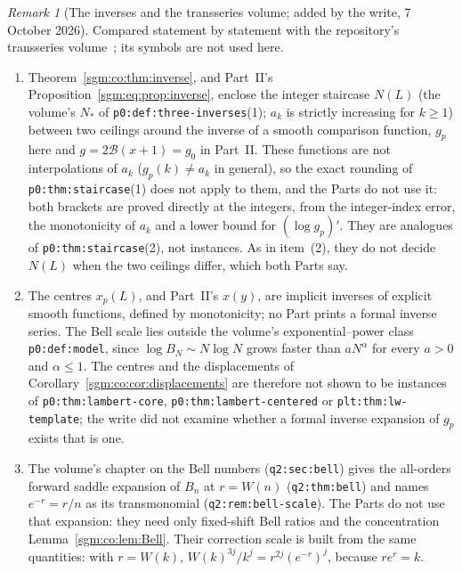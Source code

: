 \documentclass[11pt,letterpaper]{article}
\theoremstyle{remark}\newtheorem{remark}[theorem]{Remark}
\newcommand{\file}[1]{\nolinkurl{#1}}
\theoremstyle{definition}\newtheorem{definition}[theorem]{Definition}
\begin{document}
\begin{remark}[The inverses and the transseries volume; added by the write, 7 October 2026]\label{sgm:co:rem:transseries}
Compared statement by statement with the repository's transseries volume~\cite{TSvol}; its symbols are not used here.
\begin{enumerate}
\item Theorem~\ref{sgm:co:thm:inverse}, and Part~II's Proposition~\ref{sgm:eq:prop:inverse}, enclose the integer staircase $N(L)$ (the volume's $N_\ast$ of \file{p0:def:three-inverses}(1); $a_k$ is strictly increasing for $k\ge1$) between two ceilings around the inverse of a smooth comparison function, $g_p$ here and $g=2\mathcal B(x+1)=g_0$ in Part~II. These functions are not interpolations of $a_k$ ($g_p(k)\ne a_k$ in general), so the exact rounding of \file{p0:thm:staircase}(1) does not apply to them, and the Parts do not use it: both brackets are proved directly at the integers, from the integer-index error, the monotonicity of $a_k$ and a lower bound for $(\log g_p)'$. They are analogues of \file{p0:thm:staircase}(2), not instances. As in item~(2), they do not decide $N(L)$ when the two ceilings differ, which both Parts say.
\item The centres $x_p(L)$, and Part~II's $x(y)$, are implicit inverses of explicit smooth functions, defined by monotonicity; no Part prints a formal inverse series. The Bell scale lies outside the volume's exponential--power class \file{p0:def:model}, since $\log B_N\sim N\log N$ grows faster than $aN^\alpha$ for every $a>0$ and $\alpha\le1$. The centres and the displacements of Corollary~\ref{sgm:co:cor:displacements} are therefore not shown to be instances of \file{p0:thm:lambert-core}, \file{p0:thm:lambert-centered} or \file{plt:thm:lw-template}; the write did not examine whether a formal inverse expansion of $g_p$ exists that is one.
\item The volume's chapter on the Bell numbers (\file{q2:sec:bell}) gives the all-orders forward saddle expansion of $B_n$ at $r=W(n)$ (\file{q2:thm:bell}) and names $e^{-r}=r/n$ as its transmonomial (\file{q2:rem:bell-scale}). The Parts do not use that expansion: they need only fixed-shift Bell ratios and the concentration Lemma~\ref{sgm:co:lem:Bell}. Their correction scale is built from the same quantities: with $r=W(k)$, $W(k)^{3j}/k^j=r^{2j}(e^{-r})^j$, because $re^r=k$.
\end{enumerate}
\end{remark}
\end{document}
